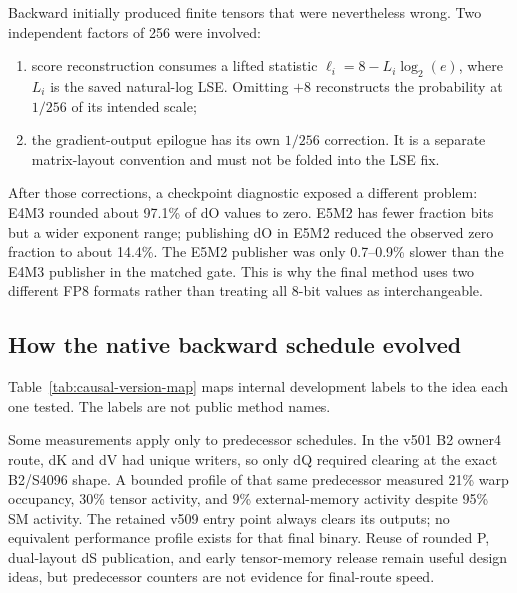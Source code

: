 Backward initially produced finite tensors that were nevertheless wrong.  Two
independent factors of 256 were involved:

\begin{enumerate}
  \item score reconstruction consumes a lifted statistic
  $\ell_i=8-L_i\log_2(e)$, where $L_i$ is the saved natural-log LSE.  Omitting
  $+8$ reconstructs the probability at $1/256$ of its intended scale;
  \item the gradient-output epilogue has its own $1/256$ correction.  It is a
  separate matrix-layout convention and must not be folded into the LSE fix.
\end{enumerate}

After those corrections, a checkpoint diagnostic exposed a different problem:
E4M3 rounded about 97.1\% of dO values to zero.  E5M2 has fewer fraction bits
but a wider exponent range; publishing dO in E5M2 reduced the observed zero
fraction to about 14.4\%.  The E5M2 publisher was only 0.7--0.9\% slower than
the E4M3 publisher in the matched gate.  This is why the final method uses two
different FP8 formats rather than treating all 8-bit values as interchangeable.

\subsection{How the native backward schedule evolved}

Table~\ref{tab:causal-version-map} maps internal development labels to the
idea each one tested.  The labels are not public method names.

Some measurements apply only to predecessor schedules.  In the v501 B2 owner4
route, dK and dV had unique writers, so only dQ required clearing at the exact
B2/S4096 shape.  A bounded profile of that same predecessor measured 21\% warp
occupancy, 30\% tensor activity, and 9\% external-memory activity despite 95\%
SM activity.  The retained v509 entry point always clears its outputs; no
equivalent performance profile exists for that final binary.  Reuse of rounded
P, dual-layout dS publication, and early tensor-memory release remain useful
design ideas, but predecessor counters are not evidence for final-route speed.

